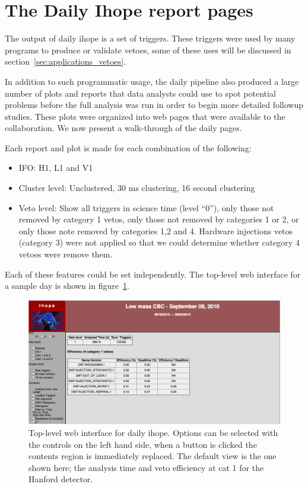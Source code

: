 
\section{The Daily Ihope report pages}
\label{sec:daily_pages}

The output of daily ihope is a set of triggers.  These triggers were
used by many programs to produce or validate vetoes, some of these
uses will be discussed in section~\ref{sec:applications_vetoes}.  

In addition to such programmatic usage, the daily pipeline also
produced a large number of plots and reports that data analysts could
use to spot potential problems before the full analysis was run in
order to begin more detailed followup studies.  These plots were
organized into web pages that were available to the collaboration.  We
now present a walk-through of the daily pages.

Each report and plot is made for each combination of the following:

\begin{itemize}
\item IFO: H1, L1 and V1
\item Cluster level: Unclustered, 30 ms clustering, 16 second
clustering
\item Veto level: Show all triggers in science time (level ``0''),
only those not removed by category 1 vetos, only those not
removed by categories 1 or 2, or only those note removed by
categories 1,2 and 4.  Hardware injections vetos (category 3) were not 
applied so that we could determine whether category 4 vetoes were 
remove them.
\end{itemize}

Each of these features could be set independently.  The top-level web
interface for a sample day is shown in figure~\ref{f:daily_ihope_top}.

\begin{figure}
  \includegraphics[width=\linewidth]{figures/detchar/daily_ihope_top}
  \caption[Top-level web interface for daily ihope]{
  \label{f:daily_ihope_top}
Top-level web interface for daily ihope.  Options can be selected with
the controls on the left hand side, when a button is clicked the
contents region is immediately replaced.  The default view is the one
shown here; the analysis time and veto efficiency at cat 1 for the
Hanford detector.}
\end{figure}%

